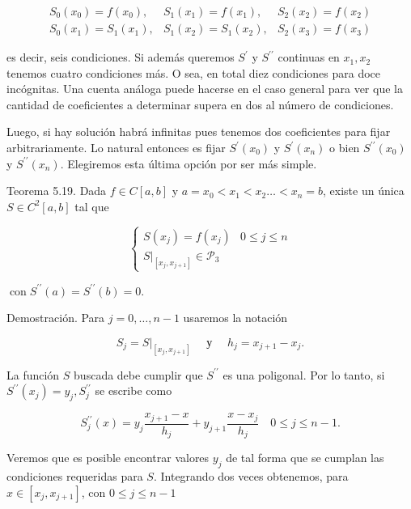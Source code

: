 \documentclass[10pt]{article}
\begin{document}
$$
\begin{array}{lll}
S_{0}\left(x_{0}\right)=f\left(x_{0}\right), & S_{1}\left(x_{1}\right)=f\left(x_{1}\right), & S_{2}\left(x_{2}\right)=f\left(x_{2}\right) \\
S_{0}\left(x_{1}\right)=S_{1}\left(x_{1}\right), & S_{1}\left(x_{2}\right)=S_{1}\left(x_{2}\right), & S_{2}\left(x_{3}\right)=f\left(x_{3}\right)
\end{array}
$$

es decir, seis condiciones. Si además queremos $S^{\prime}$ y $S^{\prime \prime}$ continuas en $x_{1}, x_{2}$ tenemos cuatro condiciones más. O sea, en total diez condiciones para doce incógnitas. Una cuenta análoga puede hacerse en el caso general para ver que la cantidad de coeficientes a determinar supera en dos al número de condiciones.

Luego, si hay solución habrá infinitas pues tenemos dos coeficientes para fijar arbitrariamente. Lo natural entonces es fijar $S^{\prime}\left(x_{0}\right)$ y $S^{\prime}\left(x_{n}\right)$ o bien $S^{\prime \prime}\left(x_{0}\right)$ y $S^{\prime \prime}\left(x_{n}\right)$. Elegiremos esta última opción por ser más simple.

Teorema 5.19. Dada $f \in C[a, b]$ y $a=x_{0}<x_{1}<x_{2} \ldots<x_{n}=b$, existe un única $S \in C^{2}[a, b]$ tal que

$$
\begin{cases}S\left(x_{j}\right)=f\left(x_{j}\right) & 0 \leq j \leq n \\ \left.S\right|_{\left[x_{j}, x_{j+1}\right]} \in \mathcal{P}_{3} & \end{cases}
$$

$\operatorname{con} S^{\prime \prime}(a)=S^{\prime \prime}(b)=0$.

Demostración. Para $j=0, \ldots, n-1$ usaremos la notación

$$
S_{j}=\left.S\right|_{\left[x_{j}, x_{j+1}\right]} \quad \text { у } \quad h_{j}=x_{j+1}-x_{j} .
$$

La función $S$ buscada debe cumplir que $S^{\prime \prime}$ es una poligonal. Por lo tanto, si $S^{\prime \prime}\left(x_{j}\right)=y_{j}, S_{j}^{\prime \prime}$ se escribe como

$$
S_{j}^{\prime \prime}(x)=y_{j} \frac{x_{j+1}-x}{h_{j}}+y_{j+1} \frac{x-x_{j}}{h_{j}} \quad 0 \leq j \leq n-1 .
$$

Veremos que es posible encontrar valores $y_{j}$ de tal forma que se cumplan las condiciones requeridas para $S$. Integrando dos veces obtenemos, para $x \in\left[x_{j}, x_{j+1}\right]$, con $0 \leq j \leq n-1$
\end{document}
